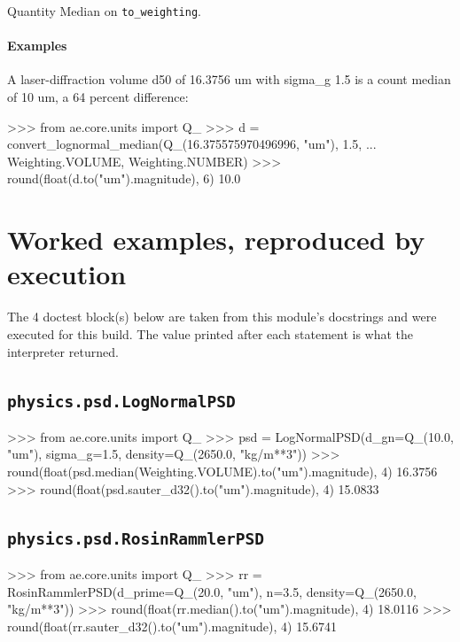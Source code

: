 \documentclass[10pt,a4paper,twoside]{report}
\begin{document}
Quantity Median on \texttt{to\_weighting}.

\paragraph*{Examples}

A laser-diffraction volume d50 of 16.3756 um with sigma\_g 1.5 is a count median of 10 um, a 64 percent difference:

\begin{doctestblock}
>>> from ae.core.units import Q_
>>> d = convert_lognormal_median(Q_(16.375575970496996, "um"), 1.5,
...                              Weighting.VOLUME, Weighting.NUMBER)
>>> round(float(d.to("um").magnitude), 6)
10.0
\end{doctestblock}

\section{Worked examples, reproduced by execution}

The 4 doctest block(s) below are taken from this module's docstrings and were executed for this build. The value printed after each statement is what the interpreter returned.

\subsection*{\texttt{physics.psd.LogNormalPSD}}

\begin{doctestblock}
>>> from ae.core.units import Q_
>>> psd = LogNormalPSD(d_gn=Q_(10.0, "um"), sigma_g=1.5, density=Q_(2650.0, "kg/m**3"))
>>> round(float(psd.median(Weighting.VOLUME).to("um").magnitude), 4)
16.3756
>>> round(float(psd.sauter_d32().to("um").magnitude), 4)
15.0833
\end{doctestblock}

\subsection*{\texttt{physics.psd.RosinRammlerPSD}}

\begin{doctestblock}
>>> from ae.core.units import Q_
>>> rr = RosinRammlerPSD(d_prime=Q_(20.0, "um"), n=3.5, density=Q_(2650.0, "kg/m**3"))
>>> round(float(rr.median().to("um").magnitude), 4)
18.0116
>>> round(float(rr.sauter_d32().to("um").magnitude), 4)
15.6741
\end{doctestblock}
\end{document}
